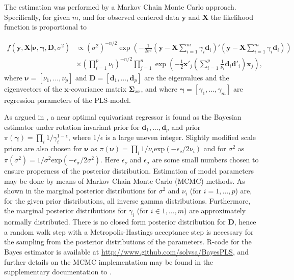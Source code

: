 \documentclass[num-refs]{wiley-article}
\begin{document}
\begin{enumerate}[label=\alph*.]
The estimation was performed by a Markov Chain Monte Carlo approach. Specifically, for given $m$, and for observed centered data $\bm{y}$ and $\bm{X}$ the likelihood function is proportional to

\begin{equation}
  \label{likelihood}
  \begin{split}
    f(\bm{y},\bm{X}|\bm{\nu}, \bm{\gamma}, \bm{D},\sigma^2) &\propto (\sigma^2)^{-n/2}
    \exp\left(-\frac{1}{2\sigma^2}(\bm{y}-\bm{X}\sum_{i=1}^{m}\gamma_i \bm{d}_i)'(\bm{y}-\bm{X}\sum_{i=1}^{m}\gamma_i \bm{d}_i)\right)\\
    &\times (\prod_{i=1}^{p}\nu_i)^{-n/2}\prod_{j=1}^{n}\exp\left(-\frac{1}{2} \bm{x}'_j(\sum_{i=1}^{p}\frac{1}{\nu_i}\bm{d}_i \bm{d}'_i)\bm{x}_j  \right),
  \end{split}
\end{equation}
where $\bm{\nu}=[\nu_1,...,\nu_p]$ and $\bm{D}=[\bm{d}_1,...,\bm{d}_p]$ are the eigenvalues and the eigenvectors of the $\bm{x}$-covariance matrix $\bm{\Sigma}_{xx}$, and where $\bm{\gamma}=[\gamma_1,...,\gamma_m]$ are regression parameters of the PLS-model.

As argued in \citep{helland2012near}, a near optimal equivariant regressor is
found as the Bayesian estimator under rotation invariant prior for
$\bm{d}_1,...,\bm{d}_p$ and prior $\pi(\bm{\gamma})=\prod_i
1/\gamma_i^{1-\epsilon}$, where $1/\epsilon$ is a large uneven integer. Slightly
modified scale priors are also chosen for $\bm{\nu}$ as $\pi(\bm{\nu}) =\prod_i
1/\nu_i \mathrm{exp}(-\epsilon_\nu/2\nu_i)$ and for $\sigma^2$ as $ \pi(\sigma^2)=1/\sigma^2\mathrm{exp}(-\epsilon_\sigma/2\sigma^2)$. Here $\epsilon_\nu$ and $\epsilon_\sigma$ are some small numbers chosen to ensure properness of the posterior distribution. Estimation of model parameters may be done by means of Markov Chain Monte Carlo (MCMC) methods. As shown in \citep{helland2012near} the marginal posterior distributions for $\sigma^2$ and $\nu_i$ (for $i = 1,\ldots, p$) are, for the given prior distributions, all inverse gamma distributions. Furthermore, the marginal posterior distributions for $\gamma_i$ (for $i \in 1,\ldots, m$) are approximately normally distributed. There is no closed form posterior distribution for $\bm{D}$, hence a random walk step with a Metropolis-Hastings acceptance step is necessary for the sampling from the posterior distributions of the parameters. R-code for the Bayes estimator is available at \href{http://www.github.com/solvsa/BayesPLS}{http://www.github.com/solvsa/BayesPLS}, and further details on the MCMC implementation may be found in the supplementary documentation to \citep{helland2012near}.

\end{enumerate}
\end{document}

